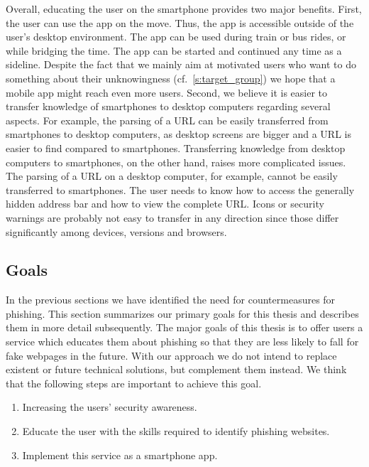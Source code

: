 \newline
Overall, educating the user on the smartphone provides two major benefits.
 First, the user can use the app on the move.
 Thus, the app is accessible outside of the user's desktop environment.
 The app can be used during train or bus rides, or while bridging the time.
 The app can be started and continued any time as a sideline.
Despite the fact that we mainly aim at motivated users who want to do something about their unknowingness (cf.~\autoref{s:target_group}) we hope that a mobile app might reach even more users.
 Second, we believe it is easier to transfer knowledge of smartphones to desktop computers regarding several aspects.
For example, the parsing of a URL can be easily transferred from smartphones to desktop computers, as desktop screens are bigger and a URL is easier to find compared to smartphones.
 Transferring knowledge from desktop computers to smartphones, on the other hand, raises more complicated issues.
The parsing of a URL on a desktop computer, for example, cannot be easily transferred to smartphones.
The user needs to know how to access the generally hidden address bar and how to view the complete URL.
Icons or security warnings are probably not easy to transfer in any direction since those differ significantly among devices, versions and browsers.

 
\subsection{Goals}
\label{s:goals}
In the previous sections we have identified the need for countermeasures for phishing.
This section summarizes our primary goals for this thesis and describes them in more detail subsequently.
The major goals of this thesis is to offer users a service which educates them about phishing so that they are less likely to fall for fake webpages in the future.
With our approach we do not intend to replace existent or future technical solutions, but complement them instead.
 We think that the following steps are important to achieve this goal.

\begin{enumerate}
	\item Increasing the users' security awareness.
	\item Educate the user with the skills required to identify phishing websites.
	\item Implement this service as a smartphone app.
\end{enumerate}

